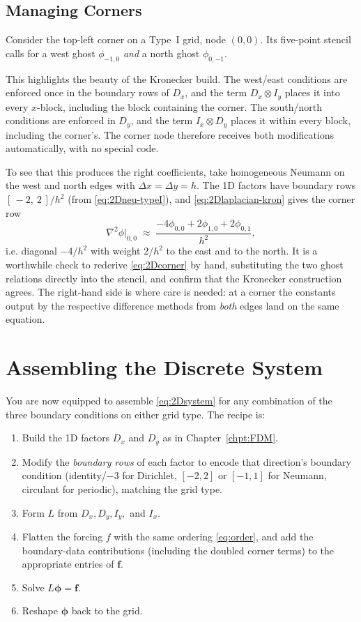 \subsection{Managing Corners}
\label{sec:2Dcorners}

Consider the top-left corner on a Type~I grid, node $(0,0)$. Its five-point
stencil calls for a west ghost $\phi_{-1,0}$ \emph{and} a north ghost
$\phi_{0,-1}$.

This highlights the beauty of the Kronecker build. The west/east conditions are enforced
once in the boundary rows of $D_x$, and the term $D_x\otimes I_y$ places it into
every $x$-block, including the block containing the corner. The south/north
conditions are enforced in $D_y$, and the term $I_x\otimes D_y$ places it within
every block, including the corner's. The corner node therefore receives both
modifications automatically, with no special code.

To see that this produces the right coefficients, take homogeneous Neumann on
the west and north edges with $\Delta x=\Delta y=h$. The 1D factors have
boundary rows $[\,-2,\ 2\,]/h^2$ (from \eqref{eq:2Dneu-typeI}), and
\eqref{eq:2Dlaplacian-kron} gives the corner row
\begin{equation}
    \nabla^2\phi\big|_{0,0}
    \;\approx\;
    \frac{-4\phi_{0,0}+2\phi_{1,0}+2\phi_{0,1}}{h^2},
    \label{eq:2Dcorner}
\end{equation}
i.e. diagonal $-4/h^2$ with weight $2/h^2$ to the east and to the north. It is
a worthwhile check to rederive \eqref{eq:2Dcorner} by hand, substituting the
two ghost relations directly into the stencil, and confirm that the Kronecker
construction agrees. The right-hand side is where care is needed: at a corner
the constants output by the respective difference methods from \emph{both} edges land on the same equation.


\section{Assembling the Discrete System}
\label{sec:2Dassembly}

You are now equipped to assemble \eqref{eq:2Dsystem} for any combination of the
three boundary conditions on either grid type. The recipe is:
\begin{enumerate}
    \item Build the 1D factors $D_x$ and $D_y$ as in Chapter~\ref{chpt:FDM}.
    \item Modify the \emph{boundary rows} of each factor to encode that
    direction's boundary condition (identity/$-3$ for Dirichlet, $[-2,2]$ or
    $[-1,1]$ for Neumann, circulant for periodic), matching the grid type.
    \item Form $L$ from $D_{x}, D_{y}, I_y,$ and $I_x$.
    \item Flatten the forcing $f$ with the same ordering \eqref{eq:order}, and
    add the boundary-data contributions (including the doubled corner terms) to
    the appropriate entries of $\boldsymbol f$.
    \item Solve $L\boldsymbol\phi=\boldsymbol f$.
    \item Reshape
    $\boldsymbol\phi$ back to the grid.
\end{enumerate}


